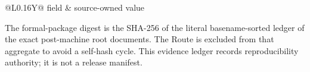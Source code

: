 \begingroup
\footnotesize
\setlength{\tabcolsep}{4pt}
\renewcommand{\arraystretch}{1.05}
\begin{tabularx}{\linewidth}{@{}L{0.16\linewidth}Y@{}}
\toprule
field & source-owned value \\
\midrule
%
\end{tabularx}
\par\smallskip
\scriptsize The formal-package digest is the SHA-256 of the literal
basename-sorted ledger of the exact post-machine root documents.  The Route is
excluded from that aggregate to avoid a self-hash cycle.  This evidence ledger
records reproducibility authority; it is not a release manifest.
\endgroup
